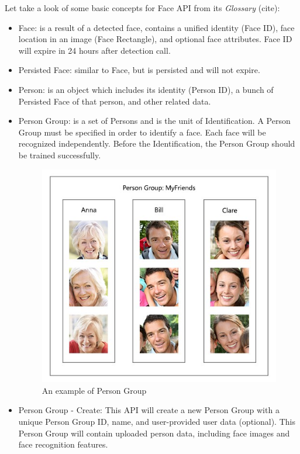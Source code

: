 Let take a look of some basic concepts for Face API from its \textit{Glossary} (cite):
\begin{itemize}
\item Face: is a result of a detected face, contains a unified identity (Face ID), face location in an image (Face Rectangle), and optional face attributes. Face ID will expire in 24 hours after detection call.
\item Persisted Face: similar to Face, but is persisted and will not expire.
\item Person: is an object which includes its identity (Person ID), a bunch of Persisted Face of that person, and other related data.
\item Person Group: is a set of Persons and is the unit of Identification. A Person Group must be specified in order to identify a face. Each face will be recognized independently. Before the Identification, the Person Group should be trained successfully.
\begin{center}
    \begin{figure}[H]
    \centering
    \includegraphics[width=1\columnwidth]{images/chap4/face-api-person-group.jpg}
    \caption{An example of Person Group}
    \end{figure}
\end{center}
\item Person Group - Create: This API will create a new Person Group with a unique Person Group ID, name, and user-provided user data (optional). This Person Group will contain uploaded person data, including face images and face recognition features.

\end{itemize}
